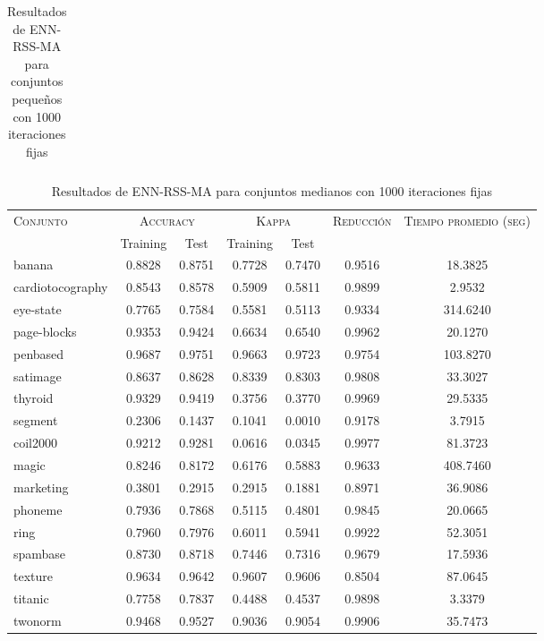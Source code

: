 \begin{table}[]
\begin{tabular}{l c c c c c c}
\hline
\end{tabular}
\caption{Resultados de ENN-RSS-MA para conjuntos pequeños con 1000 iteraciones fijas}
\label{res-peq-ENN-RSS-MA}
\end{table}


\begin{table}[]
\centering
\begin{tabular}{l c c c c c c}
\hline
\multirow{2}{*}{\textsc{Conjunto}}
	& \multicolumn{2}{c}{\textsc{Accuracy}}
	& \multicolumn{2}{c}{\textsc{Kappa}}
	& \textsc{Reducción}
	& \textsc{Tiempo promedio (seg)} \\
	& Training & Test
	& Training & Test \\ 
\hline
\hline

banana & 0.8828 & 0.8751 & 0.7728 & 0.7470 & 0.9516 & 18.3825 \\
cardiotocography & 0.8543 & 0.8578 & 0.5909 & 0.5811 & 0.9899 & 2.9532 \\
eye-state & 0.7765 & 0.7584 & 0.5581 & 0.5113 & 0.9334 & 314.6240 \\
page-blocks & 0.9353 & 0.9424 & 0.6634 & 0.6540 & 0.9962 & 20.1270 \\
penbased & 0.9687 & 0.9751 & 0.9663 & 0.9723 & 0.9754 & 103.8270 \\
satimage & 0.8637 & 0.8628 & 0.8339 & 0.8303 & 0.9808 & 33.3027 \\
thyroid & 0.9329 & 0.9419 & 0.3756 & 0.3770 & 0.9969 & 29.5335 \\
segment & 0.2306 & 0.1437 & 0.1041 & 0.0010 & 0.9178 & 3.7915 \\
coil2000 & 0.9212 & 0.9281 & 0.0616 & 0.0345 & 0.9977 & 81.3723 \\
magic & 0.8246 & 0.8172 & 0.6176 & 0.5883 & 0.9633 & 408.7460 \\
marketing & 0.3801 & 0.2915 & 0.2915 & 0.1881 & 0.8971 & 36.9086 \\
phoneme & 0.7936 & 0.7868 & 0.5115 & 0.4801 & 0.9845 & 20.0665 \\
ring & 0.7960 & 0.7976 & 0.6011 & 0.5941 & 0.9922 & 52.3051 \\
spambase & 0.8730 & 0.8718 & 0.7446 & 0.7316 & 0.9679 & 17.5936 \\
texture & 0.9634 & 0.9642 & 0.9607 & 0.9606 & 0.8504 & 87.0645 \\
titanic & 0.7758 & 0.7837 & 0.4488 & 0.4537 & 0.9898 & 3.3379 \\
twonorm & 0.9468 & 0.9527 & 0.9036 & 0.9054 & 0.9906 & 35.7473 \\

\hline
\end{tabular}
\caption{Resultados de ENN-RSS-MA para conjuntos medianos con 1000 iteraciones fijas}
\label{res-med-ENN-RSS-MA}
\end{table}


